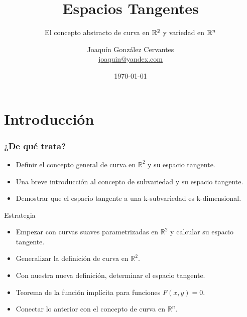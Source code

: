 \documentclass{beamer}
\title[Espacios Tangentes]{
    Espacios Tangentes}
\subtitle{El concepto abstracto de curva en $\realR^{2}$ y variedad en $\realR^{n}$}
\author[Joaquín González Cervantes]{
  Joaquín González Cervantes \\\medskip
  {\small \url{joaquin@yandex.com}}}
\institute[Universidad de Guadalajara]{}
\date[\today]{
   \today}
\def\realR{\mathbb{R}} %
\begin{document}
\begin{frame}
  \titlepage
\end{frame}

\section{Introducción}

\begin{frame}
\frametitle{¿De qué trata?}
  \begin{block}{}
    \begin{itemize}
        \item Definir el concepto general de curva en $\realR^{2}$ y su espacio tangente.
        \item Una breve introducción al concepto de subvariedad y su espacio tangente.
        \item Demostrar que el espacio tangente a una k-subvariedad es k-dimensional.
    \end{itemize}
  \end{block}
\end{frame}

\begin{frame}
  \begin{block}{Estrategia}
    \begin{itemize}
        \item Empezar con curvas suaves parametrizadas en $\realR^{2}$ y calcular su espacio tangente.
        \item Generalizar la definición de curva en $\realR^{2}$.
        \item Con nuestra nueva definición, determinar el espacio tangente.
        \item Teorema de la función implícita para funciones $F(x,y) = 0$.
        \item Conectar lo anterior con el concepto de curva en $\realR^{n}$.
    \end{itemize}
  \end{block}
\end{frame}
\end{document}

